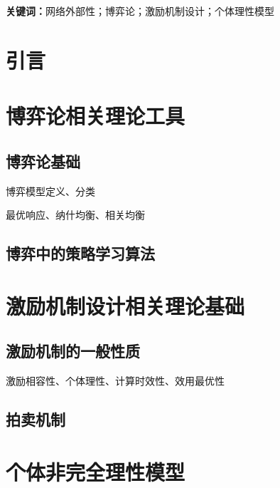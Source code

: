 
\textbf{关键词：}网络外部性；博弈论；激励机制设计；个体理性模型

\section{引言}

\section{博弈论相关理论工具}\label{sec:game}
\subsection{博弈论基础}
博弈模型定义、分类

最优响应、纳什均衡、相关均衡

\subsection{博弈中的策略学习算法}

\section{激励机制设计相关理论基础}\label{sec:mech}
\subsection{激励机制的一般性质}
激励相容性、个体理性、计算时效性、效用最优性

\subsection{拍卖机制}


\section{个体非完全理性模型}\label{sec:setup}

